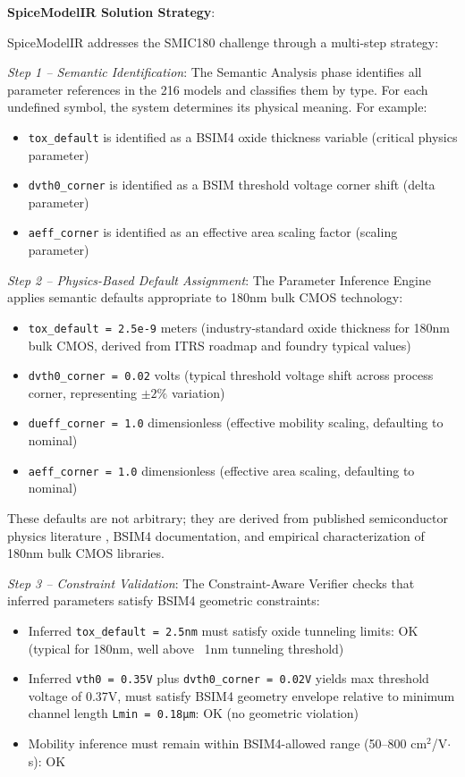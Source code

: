 \documentclass[conference]{IEEEtran}
\begin{document}
\textbf{SpiceModelIR Solution Strategy}:

SpiceModelIR addresses the SMIC180 challenge through a multi-step strategy:

\textit{Step 1 -- Semantic Identification}: The Semantic Analysis phase identifies all parameter references in the 216 models and classifies them by type. For each undefined symbol, the system determines its physical meaning. For example:
\begin{itemize}
\item \texttt{tox\_default} is identified as a BSIM4 oxide thickness variable (critical physics parameter)
\item \texttt{dvth0\_corner} is identified as a BSIM threshold voltage corner shift (delta parameter)
\item \texttt{aeff\_corner} is identified as an effective area scaling factor (scaling parameter)
\end{itemize}

\textit{Step 2 -- Physics-Based Default Assignment}: The Parameter Inference Engine applies semantic defaults appropriate to 180nm bulk CMOS technology:
\begin{itemize}
\item \texttt{tox\_default = 2.5e-9} meters (industry-standard oxide thickness for 180nm bulk CMOS, derived from ITRS roadmap and foundry typical values)
\item \texttt{dvth0\_corner = 0.02} volts (typical threshold voltage shift across process corner, representing $\pm 2\%$ variation)
\item \texttt{dueff\_corner = 1.0} dimensionless (effective mobility scaling, defaulting to nominal)
\item \texttt{aeff\_corner = 1.0} dimensionless (effective area scaling, defaulting to nominal)
\end{itemize}

These defaults are not arbitrary; they are derived from published semiconductor physics literature \cite{Tsividis_2011, Baker_2010}, BSIM4 documentation, and empirical characterization of 180nm bulk CMOS libraries.

\textit{Step 3 -- Constraint Validation}: The Constraint-Aware Verifier checks that inferred parameters satisfy BSIM4 geometric constraints:
\begin{itemize}
\item Inferred \texttt{tox\_default = 2.5nm} must satisfy oxide tunneling limits: OK (typical for 180nm, well above ~1nm tunneling threshold)
\item Inferred \texttt{vth0 = 0.35V} plus \texttt{dvth0\_corner = 0.02V} yields max threshold voltage of 0.37V, must satisfy BSIM4 geometry envelope relative to minimum channel length \texttt{Lmin = 0.18µm}: OK (no geometric violation)
\item Mobility inference must remain within BSIM4-allowed range (50--800 cm$^2$/V$\cdot$s): OK
\end{itemize}
\end{document}
